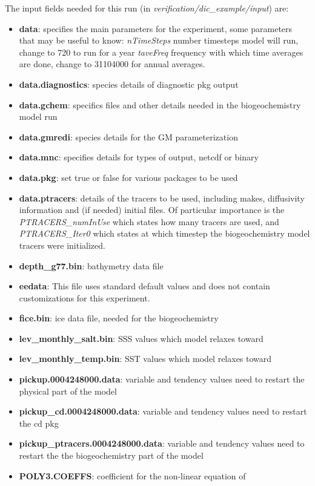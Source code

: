 \vspace{1cm}
\noindent
The input fields needed for this run (in {\it
  verification/dic\_example/input}) are:
\begin{itemize}
\item {\bf data}: specifies the main parameters for the experiment,
  some parameters that may be useful to know: {\it nTimeSteps} number
  timesteps model will run, change to 720 to run for a year {\it
    taveFreq} frequency with which time averages are done, change to
  31104000 for annual averages.
\item {\bf data.diagnostics}: species details of diagnostic pkg output
\item {\bf data.gchem}: specifics files and other details needed in
  the biogeochemistry model run
\item {\bf data.gmredi}: species details for the GM parameterization
\item {\bf data.mnc}: specifies details for types of output, netcdf or
  binary
\item {\bf data.pkg}: set true or false for various packages to be
  used
\item {\bf data.ptracers}: details of the tracers to be used,
  including makes, diffusivity information and (if needed) initial
  files. Of particular importance is the {\it PTRACERS\_numInUse}
  which states how many tracers are used, and {\it PTRACERS\_Iter0}
  which states at which timestep the biogeochemistry model tracers
  were initialized.
\item {\bf depth\_g77.bin}: bathymetry data file
\item {\bf eedata}: This file uses standard default values and does
  not contain customizations for this experiment.
\item {\bf fice.bin}: ice data file, needed for the biogeochemistry
\item {\bf lev\_monthly\_salt.bin}: SSS values which model relaxes
  toward
\item {\bf lev\_monthly\_temp.bin}: SST values which model relaxes
  toward
\item {\bf pickup.0004248000.data}: variable and tendency values need
  to restart the physical part of the model
\item {\bf pickup\_cd.0004248000.data}: variable and tendency values
  need to restart the cd pkg
\item {\bf pickup\_ptracers.0004248000.data}: variable and tendency
  values need to restart the the biogeochemistry part of the model
\item {\bf POLY3.COEFFS}: coefficient for the non-linear equation of

\end{itemize}
